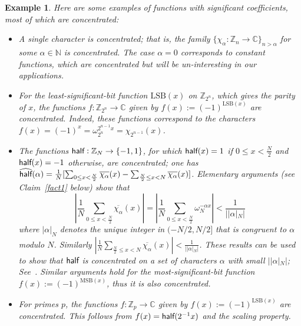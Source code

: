 \documentclass[11pt]{article}
\newtheorem{example}[theorem]{Example}
\theoremstyle{definition}
\newcommand{\N}{\mathbb{N}}
\newcommand{\Z}{\mathbb{Z}}
\newcommand{\C}{\mathbb{C}}
\newcommand{\half}{\text{\sf half}}
\newcommand{\LSB}{\text{LSB}}
\newcommand{\MSB}{\text{MSB}}
\begin{document}
\begin{example}\label{example4}
    Here are some examples of functions with significant coefficients, most of which are concentrated:
    \begin{itemize}
        \item A single character is concentrated; that is, the family $\{\chi_\alpha:\Z_n \to \C\}_{n>\alpha}$ for some $\alpha \in \N$ is concentrated. The case $\alpha = 0$ corresponds to constant functions, which are concentrated but will be un-interesting in our applications.

        \item For the least-significant-bit function $\LSB(x)$ on $\Z_{2^n}$, which gives the parity of $x$, the functions $f : \Z_{2^n} \to \C$ given by $f(x):=(-1)^{\LSB(x)}$ are concentrated.
              Indeed, these functions correspond to the characters $f(x) = (-1)^x = \omega_{2^n}^{2^{n-1} x} = \chi_{2^{n-1}}(x)$.

        \item The functions $\half :\Z_N \to \{-1,1\}$, for which $\half(x) = 1$ if $0 \leq x < \frac{N}{2}$ and $\half(x) = -1$ otherwise, are concentrated; one has $\widehat{\half}(\alpha) = \frac{1}{N} [ \sum_{0 \leq x < \frac{N}{2}} \overline{\chi_\alpha}(x) - \sum_{\frac{N}{2} \leq x < N} \overline{\chi_\alpha}(x) ]$.
              Elementary arguments (see Claim~\ref{fact1} below) show that
              \[
                  \left| \frac{1}{N}\sum_{0 \leq x < \frac{N}{2}}\overline{\chi_\alpha}(x) \right|
                  = \left| \frac{1}{N}\sum_{0 \leq x < \frac{N}{2}} \omega_N^{-\alpha x} \right|
                  < \frac{1}{| |\alpha|_N|}
              \]
              where $|\alpha|_N$ denotes the unique integer in $(-N/2, N/2]$ that is congruent to $\alpha$ modulo $N$.
              Similarly $\left|\frac{1}{N}\sum_{\frac{N}{2} \leq x < N}\overline{\chi_\alpha}(x)\right|<\frac{1}{| |\alpha|_N |}$.
              These results can be used to show that $\half$ is concentrated on a set of characters $\alpha$ with small $| |\alpha|_N |$; See~\cite[Claim 4.1]{AGS}. Similar arguments hold for the most-significant-bit function $f(x):=(-1)^{\MSB(x)}$, thus it is also concentrated.

        \item For primes $p$, the functions $f:\Z_p\to \C$ given by $f(x):=(-1)^{\LSB(x)}$ are concentrated.
              This follows from $f(x) = \half(2^{-1} x)$ and the scaling property.


\end{itemize}
\end{example}
\end{document}

